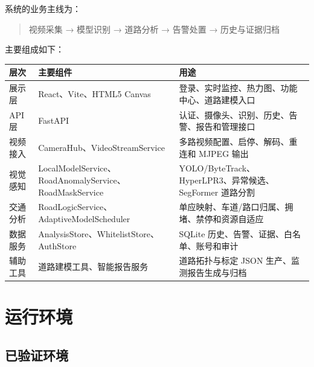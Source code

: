 系统的业务主线为：

\begin{quote}
视频采集 → 模型识别 → 道路分析 → 告警处置 → 历史与证据归档
\end{quote}

主要组成如下：

\begin{longtable}[]{@{}
  >{\raggedright\arraybackslash}p{}
  >{\raggedright\arraybackslash}p{}
  >{\raggedright\arraybackslash}p{}@{}}
\toprule\noalign{}
\begin{minipage}[b]{\linewidth}\raggedright
层次
\end{minipage} & \begin{minipage}[b]{\linewidth}\raggedright
主要组件
\end{minipage} & \begin{minipage}[b]{\linewidth}\raggedright
用途
\end{minipage} \\
\midrule\noalign{}
\endhead
\bottomrule\noalign{}
\endlastfoot
展示层 & React、Vite、HTML5 Canvas & 登录、实时监控、热力图、功能中心、道路建模入口 \\
API 层 & FastAPI & 认证、摄像头、识别、历史、告警、报告和管理接口 \\
视频接入 & CameraHub、VideoStreamService & 多路视频配置、启停、解码、重连和 MJPEG 输出 \\
视觉感知 & LocalModelService、RoadAnomalyService、RoadMaskService & YOLO/ByteTrack、HyperLPR3、异常候选、SegFormer 道路分割 \\
交通分析 & RoadLogicService、AdaptiveModelScheduler & 单应映射、车道/路口归属、拥堵、禁停和资源自适应 \\
数据服务 & AnalysisStore、WhitelistStore、AuthStore & SQLite 历史、告警、证据、白名单、账号和审计 \\
辅助工具 & 道路建模工具、智能报告服务 & 道路拓扑与标定 JSON 生产、监测报告生成与归档 \\
\end{longtable}

\section{运行环境}\label{manual-ux8fd0ux884cux73afux5883}

\subsection{已验证环境}\label{manual-ux5df2ux9a8cux8bc1ux73afux5883}

